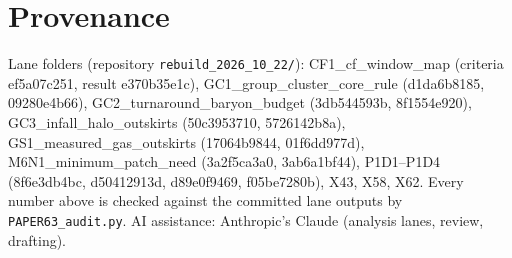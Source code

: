 \documentclass[10pt]{article}
\begin{document}
\section*{Provenance}
Lane folders (repository \texttt{rebuild\_2026\_10\_22/}): CF1\_cf\_window\_map (criteria ef5a07c251, result e370b35e1c), GC1\_group\_cluster\_core\_rule (d1da6b8185, 09280e4b66), GC2\_turnaround\_baryon\_budget (3db544593b, 8f1554e920), GC3\_infall\_halo\_outskirts (50c3953710, 5726142b8a), GS1\_measured\_gas\_outskirts (17064b9844, 01f6dd977d), M6N1\_minimum\_patch\_need (3a2f5ca3a0, 3ab6a1bf44), P1D1--P1D4 (8f6e3db4bc, d50412913d, d89e0f9469, f05be7280b), X43, X58, X62. Every number above is checked against the committed lane outputs by \texttt{PAPER63\_audit.py}. AI assistance: Anthropic's Claude (analysis lanes, review, drafting).
\end{document}

